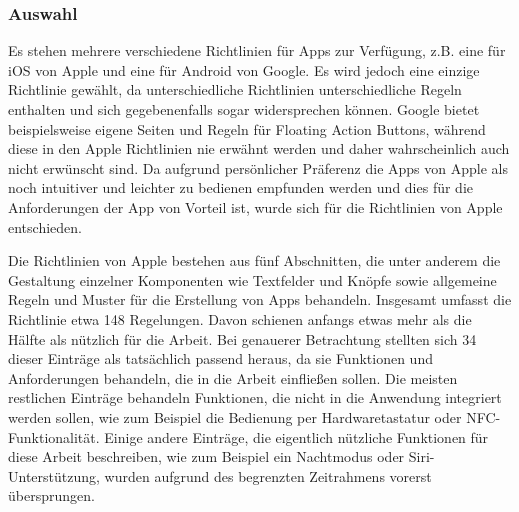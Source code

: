 \subsubsection{Auswahl}


\myNewSection
	Es stehen mehrere verschiedene Richtlinien für Apps zur Verfügung, z.B. eine für iOS von Apple und eine für Android von Google\cite{konventionen_platforms_ios, konventionen_guidelinesGoogle}. %
	Es wird jedoch eine einzige Richtlinie gewählt, da unterschiedliche Richtlinien unterschiedliche Regeln enthalten und sich gegebenenfalls sogar widersprechen können. %
		Google bietet beispielsweise eigene Seiten und Regeln für \glqq Floating Action Buttons\grqq{}\cite{konventionen_floatingActionButton}, während diese in den Apple Richtlinien nie erwähnt werden und daher wahrscheinlich auch nicht erwünscht sind. %
	Da aufgrund persönlicher Präferenz die Apps von Apple als noch intuitiver und leichter zu bedienen empfunden werden und dies für die Anforderungen der App von Vorteil ist, wurde sich für die Richtlinien von Apple entschieden.%
	
\myNewSection
	Die Richtlinien von Apple bestehen aus fünf Abschnitten, die unter anderem die Gestaltung einzelner Komponenten wie Textfelder und Knöpfe sowie allgemeine Regeln und Muster für die Erstellung von Apps behandeln. Insgesamt umfasst die Richtlinie etwa 148 Regelungen. %
	Davon schienen anfangs etwas mehr als die Hälfte als nützlich für die Arbeit. Bei genauerer Betrachtung stellten sich 34 dieser Einträge als tatsächlich passend heraus, da sie Funktionen und Anforderungen behandeln, die in die Arbeit einfließen sollen. %
	Die meisten restlichen Einträge behandeln Funktionen, die nicht in die Anwendung integriert werden sollen, wie zum Beispiel die Bedienung per Hardwaretastatur oder NFC-Funktionalität\cite{konventionen_keyboard, konventionen_nfc}. Einige andere Einträge, die eigentlich nützliche Funktionen für diese Arbeit beschreiben, wie zum Beispiel ein Nachtmodus oder Siri-Unterstützung, wurden aufgrund des begrenzten Zeitrahmens vorerst übersprungen\cite{konventionen_darkmode,konventionen_siri}.%